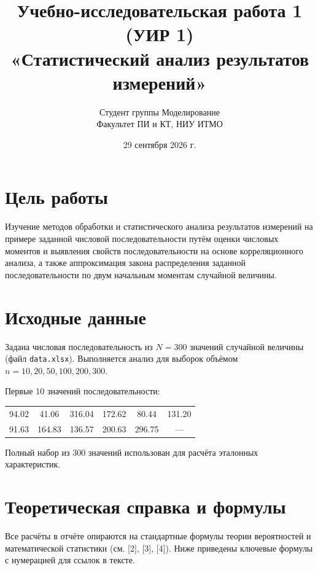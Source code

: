 \documentclass[a4paper,12pt]{article}
\title{Учебно-исследовательская работа 1 (УИР 1)\\\large «Статистический анализ результатов измерений»}
\author{Студент группы Моделирование\\Факультет ПИ и КТ, НИУ ИТМО}
\date{29 сентября 2026 г.}
\begin{document}
\maketitle
\thispagestyle{empty}

\tableofcontents
\newpage

\section{Цель работы}
Изучение методов обработки и статистического анализа результатов измерений на примере заданной числовой последовательности путём оценки числовых моментов и выявления свойств последовательности на основе корреляционного анализа, а также аппроксимация закона распределения заданной последовательности по двум начальным моментам случайной величины.

\section{Исходные данные}
Задана числовая последовательность из $N=300$ значений случайной величины (файл \texttt{data.xlsx}).
Выполняется анализ для выборок объёмом $n = 10, 20, 50, 100, 200, 300$.

Первые 10 значений последовательности:
\begin{center}
\begin{tabular}{|c|c|c|c|c|c|}
\hline
94.02 & 41.06 & 316.04 & 172.62 & 80.44 & 131.20 \\
91.63 & 164.83 & 136.57 & 200.63 & 296.75 & --- \\
\hline
\end{tabular}
\end{center}

Полный набор из 300 значений использован для расчёта эталонных характеристик.

\section{Теоретическая справка и формулы}

Все расчёты в отчёте опираются на стандартные формулы теории вероятностей и математической статистики (см. [2], [3], [4]). Ниже приведены ключевые формулы с нумерацией для ссылок в тексте.
\end{document}
